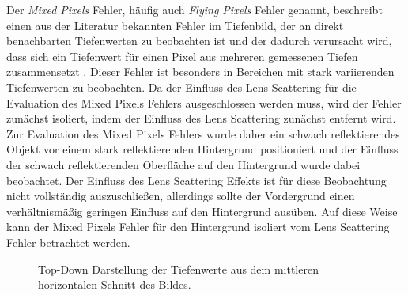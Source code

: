 \documentclass[thesis.tex]{subfiles}
\begin{document}
Der \emph{Mixed Pixels} Fehler, häufig auch \emph{Flying Pixels} Fehler genannt, beschreibt einen aus der Literatur bekannten Fehler im Tiefenbild, der an direkt benachbarten Tiefenwerten zu beobachten ist und der dadurch verursacht wird, dass sich ein Tiefenwert für einen Pixel aus mehreren gemessenen Tiefen zusammensetzt \cite{bib:Giancola2018}\cite{bib:Teichman2013}\cite{bib:Butkiewicz2014}\cite{bib:Hertzberg2014}. Dieser Fehler ist besonders in Bereichen mit stark variierenden Tiefenwerten zu beobachten. Da der Einfluss des Lens Scattering für die Evaluation des Mixed Pixels Fehlers ausgeschlossen werden muss, wird der Fehler zunächst isoliert, indem der Einfluss des Lens Scattering zunächst entfernt wird. Zur Evaluation des Mixed Pixels Fehlers wurde daher ein schwach reflektierendes Objekt vor einem stark reflektierenden Hintergrund positioniert und der Einfluss der schwach reflektierenden Oberfläche auf den Hintergrund wurde dabei beobachtet. Der Einfluss des Lens Scattering Effekts ist für diese Beobachtung nicht vollständig auszuschließen, allerdings sollte der Vordergrund einen verhältnismäßig geringen Einfluss auf den Hintergrund ausüben. Auf diese Weise kann der Mixed Pixels Fehler für den Hintergrund isoliert vom Lens Scattering Fehler betrachtet werden.

\begin{figure}[h!]
\centering
{}
\caption{Top-Down Darstellung der Tiefenwerte aus dem mittleren horizontalen Schnitt des Bildes.}
\label{fig:mixed_pixels_evaluation_one}
\end{figure}
\end{document}
